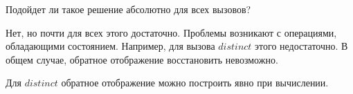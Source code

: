 \begin{frame}
\frametitle{\insertsection} 
\framesubtitle{\insertsubsection}
Подойдет ли такое решение абсолютно для всех вызовов?

Нет, но почти для всех этого достаточно. Проблемы возникают с операциями, обладающими состоянием. Например, для вызова $distinct$ этого недостаточно. В общем случае, обратное отображение восстановить невозможно.

Для $distinct$ обратное отображение можно построить явно при вычислении.
\end{frame}
